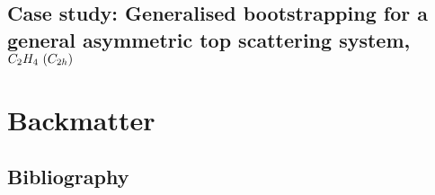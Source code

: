 \documentclass[letterpaper,table,10pt,english]{jupyterBook}
\begin{document}
\chapter{Case study: Generalised bootstrapping for a general asymmetric top scattering system, \protect\(C_2H_4~(C_{2h})\protect\)}
\label{\detokenize{part2/case-study-C2H4_270423:case-study-generalised-bootstrapping-for-a-general-asymmetric-top-scattering-system-c-2h-4-c-2h}}\label{\detokenize{part2/case-study-C2H4_270423:chpt-c2h4-case-study}}\label{\detokenize{part2/case-study-C2H4_270423::doc}}
\sphinxstepscope


\part{Backmatter}

\sphinxstepscope


\chapter{Bibliography}
\label{\detokenize{backmatter/bibliography:bibliography}}\label{\detokenize{backmatter/bibliography::doc}}\label{\detokenize{backmatter/bibliography:id1}}
\sphinxstepscope
\end{document}
